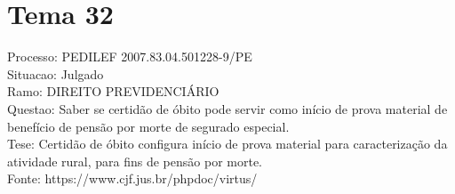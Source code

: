 \documentclass[12pt]{article}
\begin{document}
\section*{Tema 32}
Processo: PEDILEF 2007.83.04.501228-9/PE\\
Situacao: Julgado\\
Ramo: DIREITO PREVIDENCIÁRIO\\
Questao: Saber se certidão de óbito pode servir como início de prova material de benefício de pensão por morte de segurado especial.\\
Tese: Certidão de óbito configura início de prova material para caracterização da atividade rural, para fins de pensão por morte.\\
Fonte: https://www.cjf.jus.br/phpdoc/virtus/
\end{document}
